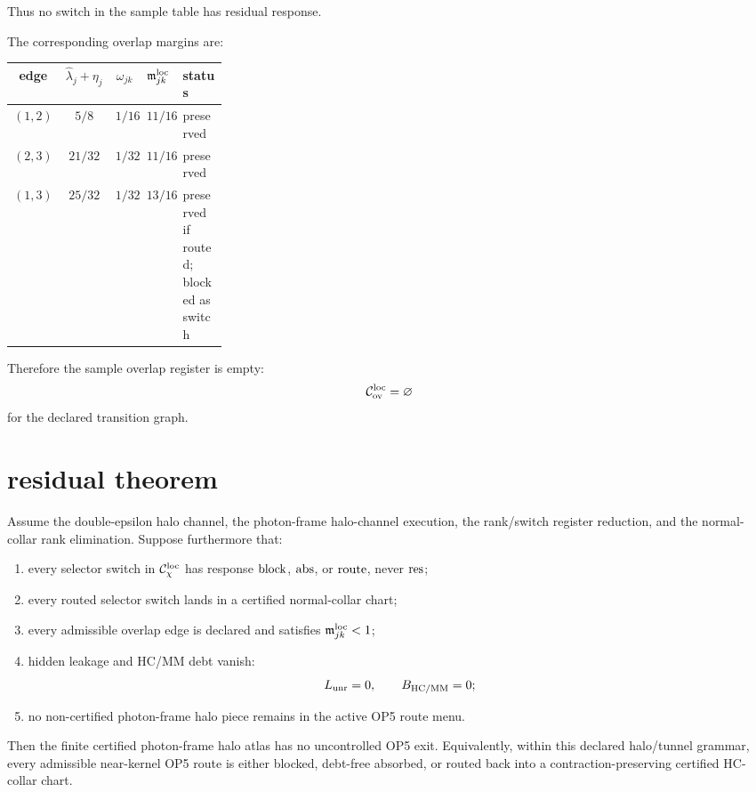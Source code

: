 Thus no switch in the sample table has residual response.

The corresponding overlap margins are:
\begin{center}
\small
\begin{tabular}{c|c|c|c|P{0.28\linewidth}}
\toprule
edge & \(\widehat\lambda_j+\eta_j\) & \(\omega_{jk}\) & \(\mathfrak m_{jk}^{\mathrm{loc}}\) & status\\
\midrule
\((1,2)\) & \(5/8\) & \(1/16\) & \(11/16\) & preserved\\
\((2,3)\) & \(21/32\) & \(1/32\) & \(11/16\) & preserved\\
\((1,3)\) & \(25/32\) & \(1/32\) & \(13/16\) & preserved if routed; blocked as switch\\
\bottomrule
\end{tabular}
\end{center}

Therefore the sample overlap register is empty:
\[
\mathcal C_{\mathrm{ov}}^{\mathrm{loc}}=\varnothing
\]
for the declared transition graph.

\section{residual theorem}

\begin{theorem}
Assume the double-epsilon halo channel, the photon-frame halo-channel execution, the rank/switch register reduction, and the normal-collar rank elimination. Suppose furthermore that:
\begin{enumerate}
\item every selector switch in \(\mathcal C_{\chi}^{\mathrm{loc}}\) has response \(\mathrm{block}\), \(\mathrm{abs}\), or \(\mathrm{route}\), never \(\mathrm{res}\);
\item every routed selector switch lands in a certified normal-collar chart;
\item every admissible overlap edge is declared and satisfies \(\mathfrak m_{jk}^{\mathrm{loc}}<1\);
\item hidden leakage and HC/MM debt vanish:
\[
L_{\mathrm{unr}}=0,
\qquad
B_{\mathrm{HC}/\mathrm{MM}}=0;
\]
\item no non-certified photon-frame halo piece remains in the active OP5 route menu.
\end{enumerate}
Then the finite certified photon-frame halo atlas has no uncontrolled OP5 exit. Equivalently, within this declared halo/tunnel grammar, every admissible near-kernel OP5 route is either blocked, debt-free absorbed, or routed back into a contraction-preserving certified HC-collar chart.
\end{theorem}

